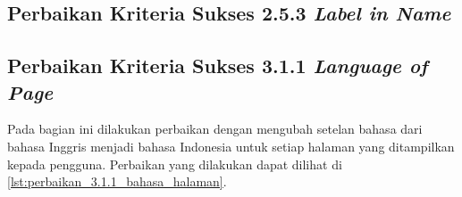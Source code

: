 \subsection{Perbaikan Kriteria Sukses 2.5.3 \textit{Label in Name}}
\label{subsec:perbaikan_kriteria_sukses_2.5.3}

\subsection{Perbaikan Kriteria Sukses 3.1.1 \textit{Language of Page}}
\label{subsec:perbaikan_kriteria_sukses_3.1.1}
Pada bagian ini dilakukan perbaikan dengan mengubah setelan bahasa dari bahasa Inggris menjadi bahasa Indonesia untuk setiap halaman yang ditampilkan kepada pengguna. Perbaikan yang dilakukan dapat dilihat di \ref{lst:perbaikan_3.1.1_bahasa_halaman}.

